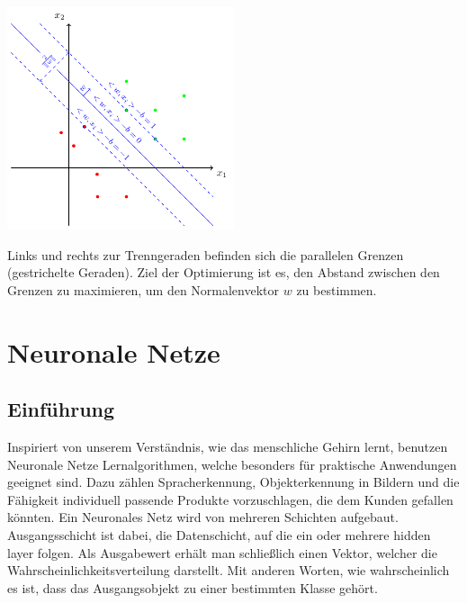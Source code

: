 \begin{dsafigure}
	\begin{center}
		\includegraphics[width=0.5\textwidth]{Figure_SVM}
		\caption{Links und rechts zur Trenngeraden befinden sich die parallelen Grenzen (gestrichelte Geraden). Ziel der Optimierung ist es, den Abstand zwischen den Grenzen zu maximieren, um den Normalenvektor $w$ zu bestimmen.}
		\label{FigSVM}
	\end{center}
\end{dsafigure}

\section{Neuronale Netze}

\subsection{Einführung}

Inspiriert von unserem Verständnis, wie das menschliche Gehirn lernt, benutzen Neuronale Netze Lernalgorithmen, welche besonders für praktische Anwendungen geeignet sind.
Dazu zählen Spracherkennung, Objekterkennung in Bildern und die Fähigkeit individuell passende Produkte vorzuschlagen, die dem Kunden gefallen könnten. 
Ein Neuronales Netz wird von mehreren Schichten aufgebaut. Ausgangsschicht ist dabei, die Datenschicht, auf die ein oder mehrere hidden layer folgen. Als Ausgabewert erhält man schließlich einen Vektor, welcher die Wahrscheinlichkeitsverteilung darstellt. Mit anderen Worten, wie wahrscheinlich es ist, dass das Ausgangsobjekt zu einer bestimmten Klasse gehört.

